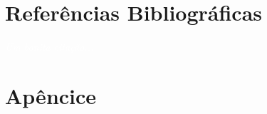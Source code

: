 \documentclass[11pt,fleqn]{book} %
\begin{document}
\chapter*{Referências Bibliográficas}\label{referencias}
\vspace{6em}
\begin{flushright}
	\textit{\textcolor{white}{Um bonita citação...}}
\end{flushright}
\vspace{12em}
\printbibliography[heading=bibempty]



%


\chapter{Apêncice}\label{apendice}
\vspace{6em}
\begin{flushright}
	\textit{\textcolor{white}{}}
\end{flushright}
\vspace{12em}
\end{document}
